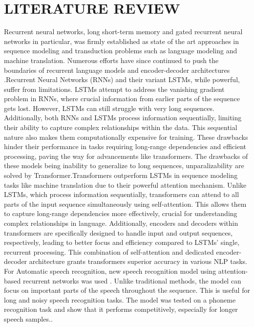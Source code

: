 \chapter{LITERATURE REVIEW}

Recurrent neural networks, long short-term memory and gated recurrent neural networks in particular, was firmly established as state of the art approaches in sequence modeling and transduction problems such as language modeling and machine translation. Numerous efforts have since continued to push the boundaries of recurrent language models and encoder-decoder architectures \cite{vaswani2017attention}.Recurrent Neural Networks (RNNs) and their variant LSTMs, while powerful, suffer from limitations. LSTMs attempt to address the vanishing gradient problem in RNNs, where crucial information from earlier parts of the sequence gets lost. However, LSTMs can still struggle with very long sequences. Additionally, both RNNs and LSTMs process information sequentially, limiting their ability to capture complex relationships within the data. This sequential nature also makes them computationally expensive for training. These drawbacks hinder their performance in tasks requiring long-range dependencies and efficient processing, paving the way for advancements like transformers.
\newline The drawbacks of these models being inability to generalize to long sequences, unparalizability are solved by Transformer.Transformers\cite{vaswani2017attention} outperform LSTMs in sequence modeling tasks like machine translation due to their powerful attention mechanism. Unlike LSTMs, which process information sequentially, transformers can attend to all parts of the input sequence simultaneously using self-attention. This allows them to capture long-range dependencies more effectively, crucial for understanding complex relationships in language. Additionally, encoders and decoders within transformers are specifically designed to handle input and output sequences, respectively, leading to better focus and efficiency compared to LSTMs' single, recurrent processing. This combination of self-attention and dedicated encoder-decoder architecture grants transformers superior accuracy in various NLP tasks. \\

For Automatic speech recognition, new speech recognition model using attention-based recurrent networks was used \cite{effectivenesschorowski2015attention}. Unlike traditional methods, the model can focus on important parts of the speech throughout the sequence. This is useful for long and noisy speech recognition tasks. The model was tested  on a phoneme recognition task and show that it performs competitively, especially for longer speech samples.\cite{effectivenesschorowski2015attention}. \newline

